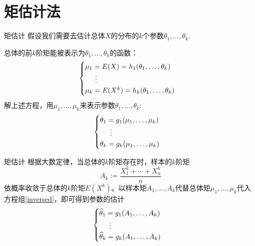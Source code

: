 
\section{矩估计法}


\begin{frame}

\begin{block}{矩估计}
假设我们需要去估计总体$X$的分布的$k$个参数$\theta_1, \ldots, \theta_k$.

\vspace{1em}

总体的前$k$阶矩能被表示为$\theta_1, \ldots, \theta_k$的函数：
\begin{equation*}
\begin{cases}
\mu_1 = E(X) = h_1(\theta_1, \ldots, \theta_k) \\
\hspace{0.5cm} \vdots \\
\mu_k = E(X^k) = h_k(\theta_1, \ldots, \theta_k)
\end{cases}
\end{equation*}
解上述方程，用$\mu_1,\ldots,\mu_k$来表示参数$\theta_1, \ldots, \theta_k$:
\begin{equation}
\label{inversed}
\begin{cases}
\theta_1 = g_1(\mu_1, \ldots, \mu_k) \\
\hspace{0.5cm} \vdots \\
\theta_k = g_k(\mu_1, \ldots, \mu_k)
\end{cases}
\end{equation}
\end{block}

\end{frame}


\begin{frame}

\begin{block}{矩估计}
根据大数定律，当总体的$k$阶矩存在时，样本的$k$阶矩
\[A_k := \dfrac{X_1^k+\cdots+X_n^k}{n}\]
依概率收敛于总体的$k$阶矩$E(X^k)$。以样本矩$A_1,\ldots,A_k$代替总体矩$\mu_1,\ldots,\mu_k$代入方程组\eqref{inversed}，即可得到参数的估计
\begin{equation*}
\begin{cases}
\widehat{\theta}_1 = g_1(A_1, \ldots, A_k) \\
\hspace{0.5cm} \vdots \\
\widehat{\theta}_k = g_k(A_1, \ldots, A_k)
\end{cases}
\end{equation*}
\end{block}

\end{frame}

